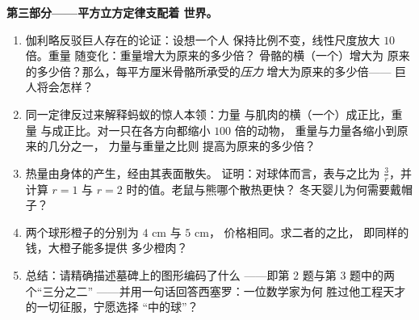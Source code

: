 \begin{problem}
\medskip
\noindent\textbf{第三部分——平方立方定律支配着
世界。}
\begin{enumerate}[resume]
  \item 伽利略反驳巨人存在的论证：设想一个人
        保持比例不变，线性尺度放大 $10$ 倍。重量
        随变化：重量增大为原来的多少倍？
        骨骼的横（一个）增大为
        原来的多少倍？那么，每平方厘米骨骼所承受的\emph{压力}
        增大为原来的多少倍——
        巨人将会怎样？
  \item 同一定律反过来解释蚂蚁的惊人本领：力量
        与肌肉的横（一个）成正比，重量
        与成正比。对一只在各方向都缩小 $100$ 倍的动物，
        重量与力量各缩小到原来的几分之一，
        力量与重量之比则
        提高为原来的多少倍？
  \item 热量由身体的产生，经由其表面散失。
        证明：对球体而言，表与之比为
        $\frac{3}{r}$，并计算 $r = 1$ 与
        $r = 2$ 时的值。老鼠与熊哪个散热更快？
        冬天婴儿为何需要戴帽子？
  \item 两个球形橙子的分别为 $4$ cm 与 $5$ cm，
        价格相同。求二者的之比，
        即同样的钱，大橙子能多提供
        多少橙肉？
  \item 总结：请精确描述墓碑上的图形编码了什么
——即第 2 题与第 3 题中的两个“三分之二”
——并用一句话回答西塞罗：一位数学家为何
        胜过他工程天才的一切征服，宁愿选择
        “中的球”？
\end{enumerate}
\end{problem}
